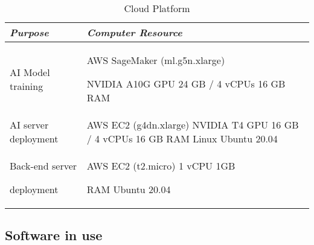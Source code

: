 \documentclass[conference]{IEEEtran}
\begin{document}
\begin{enumerate}
\begin{itemize}
        \begin{table} [ht]
            \caption{Cloud Platform}
            \centering
            \renewcommand{\arraystretch}{1.4}
            \begin{tabular}{|p{2.6cm}|p{4.4cm}|}
            \hline
                \textit{\textbf{Purpose}} & \textit{\textbf{Computer Resource}} \\
            \hline
                AI Model training & AWS SageMaker (ml.g5n.xlarge)\par NVIDIA A10G GPU 24 GB / 4 vCPUs 16 GB RAM \\
            \hline
                AI server deployment & AWS EC2 (g4dn.xlarge) NVIDIA T4 GPU 16 GB / 4 vCPUs 16 GB RAM Linux Ubuntu 20.04 \\
            \hline 
                Back-end server\par deployment & AWS EC2 (t2.micro) 1 vCPU 1GB\par RAM Ubuntu 20.04 \\
            \hline
            \end{tabular}
        \end{table}
    \end{itemize}
\end{enumerate}

\vspace{0.7em} %

\subsection{Software in use}
\vspace{0.5em}
\end{document}
